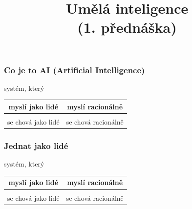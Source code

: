 \documentclass[red,handout,professionalfont]{beamer}
\title[]{Umělá inteligence \\ (1. přednáška)}
\date[]{}
\theoremstyle{definition}
\newcommand{\0}{\mbox{${\bf 0}$}}
\begin{document}



\begin{frame}{} \titlepage
\end{frame}

\begin{frame}\frametitle{Co je to AI (Artificial Intelligence)}
\large
\begin{center}
systém, který\\[1cm]
\pause{}
\begin{tabular}{c|c}
 myslí jako lidé\pause{} & myslí racionálně\pause{} \\[0.5cm]
 \hline
\\
 se chová jako lidé\pause{} &  se chová racionálně \\
\end{tabular}
\end{center}
\end{frame}

\begin{frame}\frametitle{Jednat jako lidé}
\large
\begin{center}
systém, který\\[1cm]
\begin{tabular}{c|c}
 myslí jako lidé & myslí racionálně \\[0.5cm]
 \hline
\\
 \alert{se chová jako lidé} & se chová racionálně  \\
\end{tabular}
\end{center}
\end{frame}
\end{document}
